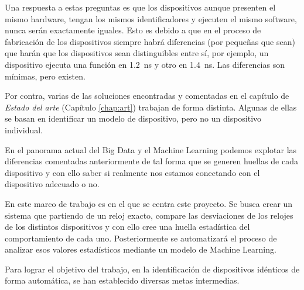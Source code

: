 Una respuesta a estas preguntas es que los dispositivos aunque presenten el mismo hardware, tengan los mismos identificadores y ejecuten el mismo software, nunca serán exactamente iguales. Esto es debido a que en el proceso de fabricación de los dispositivos siempre habrá diferencias (por pequeñas que sean) que harán que los dispositivos sean distinguibles entre sí, por ejemplo, un dispositivo ejecuta una función en \SI{1.2}{\nano\second} y otro en \SI{1.4}{\nano\second}. Las diferencias son mínimas, pero existen.

Por contra, varias de las soluciones encontradas y comentadas en el capítulo de \textit{Estado del arte} (Capítulo \ref{chap:art}) trabajan de forma distinta. Algunas de ellas se basan en identificar un modelo de dispositivo, pero no un dispositivo individual.

En el panorama actual del Big Data y el Machine Learning podemos explotar las diferencias comentadas anteriormente de tal forma que se generen huellas de cada dispositivo y con ello saber si realmente nos estamos conectando con el dispositivo adecuado o no.

En este marco de trabajo es en el que se centra este proyecto. Se busca crear un sistema que partiendo de un reloj exacto, compare las desviaciones de los relojes de los distintos dispositivos y con ello cree una huella estadística del comportamiento de cada uno. Posteriormente se automatizará el proceso de analizar esos valores estadísticos mediante un modelo de Machine Learning.

Para lograr el objetivo del trabajo, en la identificación de dispositivos idénticos de forma automática, se han establecido diversas metas intermedias.

